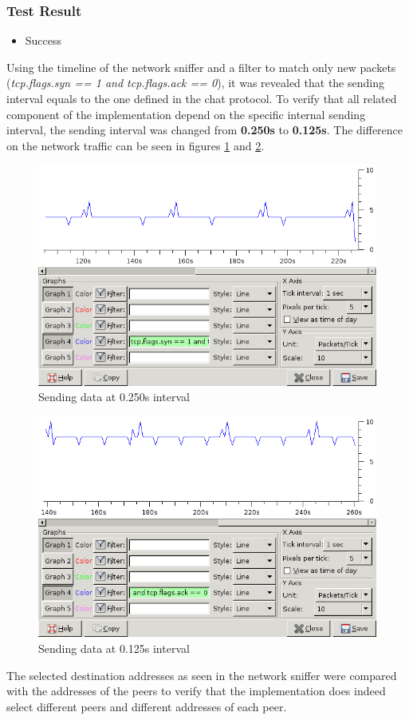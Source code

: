 \subsubsection{Test Result}
\begin{itemize}
\item Success
\end{itemize}
Using the timeline of the network sniffer and a filter
to match only new packets
(\textit{tcp.flags.syn == 1 and tcp.flags.ack == 0}),
it was revealed that the sending interval equals to
the one defined in the chat protocol. 
To verify that all related component of the
implementation depend on the specific internal sending
interval, the sending interval was changed from 
\textbf{0.250s} to \textbf{0.125s}. 
The difference on the network traffic can be seen in figures
\ref{sending0250} and \ref{sending0125}.
\begin{figure}[htbp]
\caption{Sending data at 0.250s interval}
\label{sending0250}
\centering
\includegraphics[scale=0.5]{noise-at-0250s.png}
\end{figure}
\begin{figure}[htbp]
\caption{Sending data at 0.125s interval}
\label{sending0125}
\centering
\includegraphics[scale=0.5]{noise-at-0125s.png}
\end{figure}
The selected destination addresses as seen in the network
sniffer were compared with the addresses of the peers to verify
that the implementation does indeed select different peers
and different addresses of each peer.
